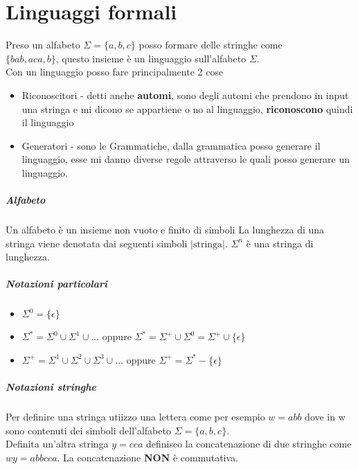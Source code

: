 \chapter{Linguaggi formali}
Preso un alfabeto $\Sigma=\{a,b,c\}$ posso formare delle stringhe come
\\ $\{bab, aca, b\}$, questo insieme è un linguaggio sull'alfabeto $\Sigma$.
\\ Con un linguaggio posso fare principalmente 2 cose
\begin{itemize}
    \item Riconoscitori - detti anche \textbf{automi}, sono degli automi che prendono in input
    una stringa e mi dicono se appartiene o no al linguaggio, \textbf{riconoscono} quindi il linguaggio
    \item Generatori - sono le Grammatiche, dalla grammatica posso generare il linguaggio,
    esse mi danno diverse regole attraverso le quali posso generare un linguaggio.
\end{itemize}
\paragraph*{Alfabeto} Un alfabeto è un insieme non vuoto e finito di simboli
La lunghezza di una stringa viene denotata dai seguenti simboli $|\text{stringa}|$.
$\Sigma^n$ è una stringa di lunghezza.
\paragraph*{Notazioni particolari}
\begin{itemize}
    \item $\Sigma^0 = \{\epsilon\}$
    \item $\Sigma^* = \Sigma^0 \cup \Sigma^1 \cup ...$ oppure $\Sigma^*=\Sigma^+ \cup \Sigma^0 = \Sigma^+ \cup \{\epsilon\}$
    \item $\Sigma^+ = \Sigma^1 \cup \Sigma^2 \cup \Sigma^3 \cup ...$ oppure $\Sigma^+ = \Sigma^* - \{\epsilon\}$
\end{itemize}
\paragraph*{Notazioni stringhe} Per definire una stringa utiizzo una lettera come per esempio
$w = abb$ dove in w sono contenuti dei simboli dell'alfabeto $\Sigma=\{a,b,c\}$.
\\ Definita un'altra stringa $y=cca$ definisco la concatenazione di due stringhe come $wy = abbcca$.
La concatenazione \textbf{NON} è commutativa.
